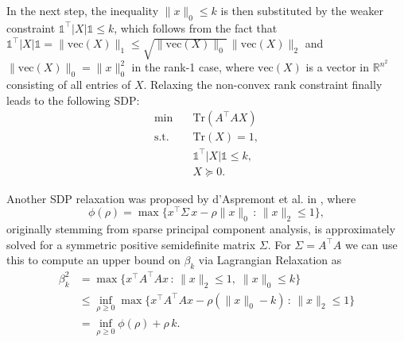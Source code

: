 \documentclass[journal]{IEEEtran}
\newcommand{\suchthat}{\,:\,}
\newcommand{\abs}[1]{\lvert{#1}\rvert}
\newcommand{\Norm}[2]{\lVert{#1}\rVert_{#2}}
\newcommand{\T}{^{\top}}
\newcommand{\Tr}{\text{Tr}}
\newcommand{\vect}{\text{vec}}
\newcommand{\R}{\mathds{R}}
\newcommand{\ones}{\mathds{1}}
\begin{document}
In the next step, the inequality $\Norm{x}{0} \leq k$ is then substituted by the weaker constraint $\ones\T
\abs{X} \ones \leq k$, which follows from the fact that $\ones\T\abs{X} \ones = \Norm{\vect(X)}{1}\leq \sqrt{\Norm{\vect(X)}{0}}\, \Norm{\vect(X)}{2}$ and $\Norm{\vect(X)}{0}=\Norm{x}{0}^2$ in the rank-1 case, where $\vect(X)$ is a vector
in $\R^{n^2}$ consisting of all entries of $X$. 
Relaxing the non-convex rank constraint finally leads to the following SDP:
\begin{equation}\label{Asp07}\tag{A1}
 \begin{aligned}
  \min \quad & \Tr(A\T A X) \\
  \text{s.t.} \quad & \Tr(X) = 1, \\
  & \ones\T \abs{X} \ones \leq k, \\
  & X \succeq 0. \nonumber
 \end{aligned}
\end{equation}

Another SDP relaxation was proposed by d'Aspremont et al. in \cite{Asp08}, where
\begin{equation}\label{phi}
  \phi(\rho) = \max \big\{ x\T \Sigma\, x - \rho \Norm{x}{0} \suchthat \Norm{x}{2} \leq 1 \big\},
\end{equation}
originally stemming from sparse principal component analysis, is approximately solved for a symmetric positive semidefinite matrix $\Sigma$. For
$\Sigma = A\T A$ we can use this to compute an upper bound on $\beta_k$ via Lagrangian Relaxation as
 \begin{align*}
  \beta_k^2 & = \max \big\{ x\T A\T A x \suchthat \Norm{x}{2} \leq 1,\; \Norm{x}{0} \leq k \big\} \\
	    & \leq \inf_{\rho \geq 0} \max \big\{ x\T A\T A x - \rho 
            (\Norm{x}{0} - k) \suchthat \Norm{x}{2} \leq 1 \big\} \\
	    & = \inf_{\rho \geq 0} \phi(\rho) + \rho\, k. 
 \end{align*}
\end{document}
